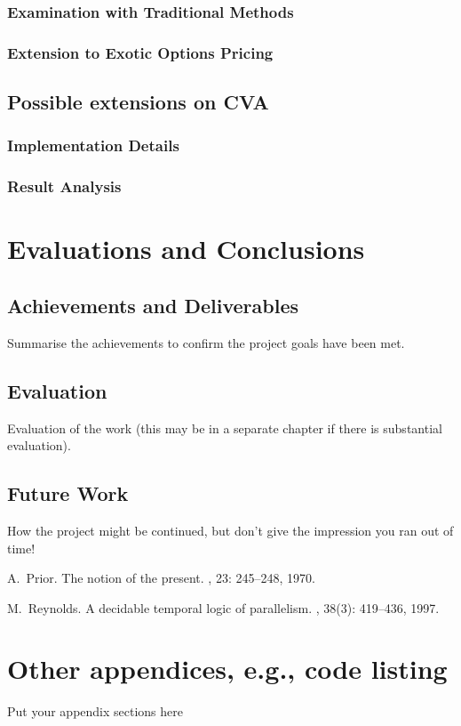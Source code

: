 \documentclass{report}
\begin{document}
\subsection{Examination with Traditional Methods}
\subsection{Extension to Exotic Options Pricing}

\section{Possible extensions on CVA}
\subsection{Implementation Details}
\subsection{Result Analysis}


\chapter{Evaluations and Conclusions}
\section{Achievements and Deliverables}
Summarise the achievements to confirm the project goals have been met.
\section{Evaluation}
Evaluation of the work (this may be in a separate chapter if there is substantial evaluation).
\section{Future Work}
How the project might be continued, but don't give the impression you ran out of time!

\appendix


\begin{thebibliography}{HHM99}


A.~Prior.
\newblock The notion of the present.
, 23:  245--248, 1970.


M.~Reynolds.
\newblock A decidable temporal logic of parallelism.
, 38(3):  419--436,
  1997.
\end{thebibliography}
\chapter{Other appendices, e.g., code listing}
Put your appendix sections here
\end{document}
